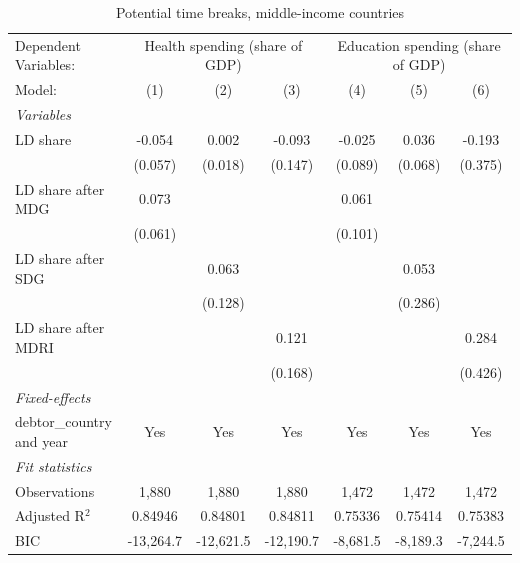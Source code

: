 
\begin{table}[htbp]
   \caption{\label{tab:results_iv_time_breaks_other} Potential time breaks, middle-income countries}
   \centering
   \begin{tabular}{lcccccc}
      \tabularnewline \midrule \midrule
      Dependent Variables: & \multicolumn{3}{c}{Health spending (share of GDP)} & \multicolumn{3}{c}{Education spending (share of GDP)}\\
      Model:                                & (1)       & (2)       & (3)       & (4)      & (5)      & (6)\\  
      \midrule
      \emph{Variables}\\
      LD share                              & -0.054    & 0.002     & -0.093    & -0.025   & 0.036    & -0.193\\   
                                            & (0.057)   & (0.018)   & (0.147)   & (0.089)  & (0.068)  & (0.375)\\   
      LD share after MDG                    & 0.073     &           &           & 0.061    &          &   \\   
                                            & (0.061)   &           &           & (0.101)  &          &   \\   
      LD share after SDG                    &           & 0.063     &           &          & 0.053    &   \\   
                                            &           & (0.128)   &           &          & (0.286)  &   \\   
      LD share after MDRI                   &           &           & 0.121     &          &          & 0.284\\   
                                            &           &           & (0.168)   &          &          & (0.426)\\   
      \midrule
      \emph{Fixed-effects}\\
      debtor\_country and year              & Yes       & Yes       & Yes       & Yes      & Yes      & Yes\\  
      \midrule
      \emph{Fit statistics}\\
      Observations                          & 1,880     & 1,880     & 1,880     & 1,472    & 1,472    & 1,472\\  
      Adjusted R$^2$                        & 0.84946   & 0.84801   & 0.84811   & 0.75336  & 0.75414  & 0.75383\\  
      BIC                                   & -13,264.7 & -12,621.5 & -12,190.7 & -8,681.5 & -8,189.3 & -7,244.5\\  

\end{tabular}
\end{table}
